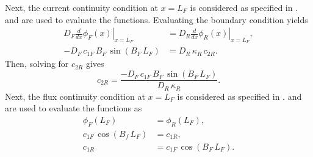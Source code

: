  Next, the current continuity condition at $x=L_F$ is considered as specified
  in .  and
   are used to evaluate the functions.
  Evaluating the boundary condition yields
  \begin{align}
    \left. D_F \frac{d}{dx} \phi_F(x) \right|_{x=L_F} &= 
      \left. D_R \frac{d}{dx} \phi_R(x) \right|_{x=L_F} ,\\
    -D_F \, c_{1F} \, B_F \, \sin(B_F \, L_F) &= D_R \, \kappa_R \, c_{2R}.
  \end{align}
  Then, solving for $c_{2R}$ gives
  \begin{equation}
    \label{eq:2reg_c2r_b}
    c_{2R} = \frac{-D_F \, c_{1F} \, B_F \, \sin(B_F \, L_F)}{D_R\,\kappa_R}.
  \end{equation}
  Next, the flux continuity condition at $x=L_F$ is considered as specified in 
  .  and 
   are used to evaluate the functions as
  \begin{align}
    \phi_F(L_F) &= \phi_R(L_F) ,\\
    c_{1F} \, \cos(B_f \, L_F) &= c_{1R} ,\\
    \label{eq:2reg_c1r}
    c_{1R} &= c_{1F} \, \cos(B_F \, L_F).
  \end{align}


